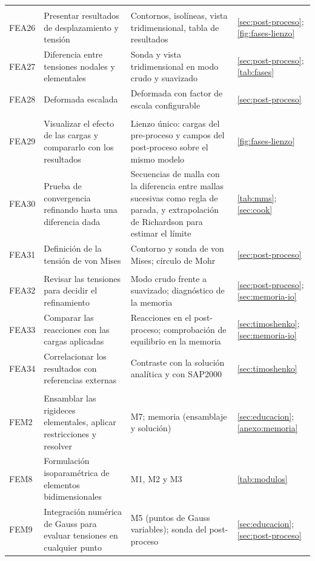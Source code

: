 {\begin{longtable}{@{}>{\raggedright\arraybackslash}p{1.3cm}>{\raggedright\arraybackslash}p{5.3cm}>{\raggedright\arraybackslash}p{5.2cm}>{\raggedright\arraybackslash}p{2.6cm}@{}}
\multicolumn{4}{@{}l}{\emph{Post-proceso}} \\
FEA26 & Presentar resultados de desplazamiento y tensión & Contornos, isolíneas, vista tridimensional, tabla de resultados & \autoref{sec:post-proceso}; \autoref{fig:fases-lienzo} \\
FEA27 & Diferencia entre tensiones nodales y elementales & Sonda y vista tridimensional en modo crudo y suavizado & \autoref{sec:post-proceso}; \autoref{tab:fases} \\
FEA28 & Deformada escalada & Deformada con factor de escala configurable & \autoref{sec:post-proceso} \\
\multicolumn{4}{@{}l}{\emph{Conceptos fundamentales}} \\
FEA29 & Visualizar el efecto de las cargas y compararlo con los resultados & Lienzo único: cargas del pre-proceso y campos del post-proceso sobre el mismo modelo & \autoref{fig:fases-lienzo} \\
FEA30 & Prueba de convergencia refinando hasta una diferencia dada & Secuencias de malla con la diferencia entre mallas sucesivas como regla de parada, y extrapolación de Richardson para estimar el límite & \autoref{tab:mms}; \autoref{sec:cook} \\
FEA31 & Definición de la tensión de von Mises & Contorno y sonda de von Mises; círculo de Mohr & \autoref{sec:post-proceso} \\
\multicolumn{4}{@{}l}{\emph{Verificación y validación}} \\
FEA32 & Revisar las tensiones para decidir el refinamiento & Modo crudo frente a suavizado; diagnóstico de la memoria & \autoref{sec:post-proceso}; \autoref{sec:memoria-io} \\
FEA33 & Comparar las reacciones con las cargas aplicadas & Reacciones en el post-proceso; comprobación de equilibrio en la memoria & \autoref{sec:timoshenko}; \autoref{sec:memoria-io} \\
FEA34 & Correlacionar los resultados con referencias externas & Contraste con la solución analítica y con SAP2000 & \autoref{sec:timoshenko} \\
\multicolumn{4}{@{}l}{\emph{Conceptos teóricos del procedimiento}} \\
FEM2 & Ensamblar las rigideces elementales, aplicar restricciones y resolver & M7; memoria (ensamblaje y solución) & \autoref{sec:educacion}; \autoref{anexo:memoria} \\
FEM8 & Formulación isoparamétrica de elementos bidimensionales & M1, M2 y M3 & \autoref{tab:modulos} \\
FEM9 & Integración numérica de Gauss para evaluar tensiones en cualquier punto & M5 (puntos de Gauss variables); sonda del post-proceso & \autoref{sec:educacion}; \autoref{sec:post-proceso} \\
\end{longtable}}
